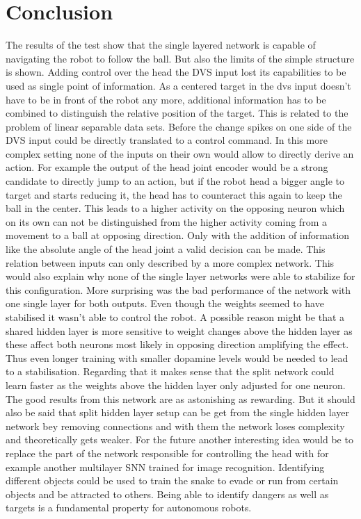\chapter{Conclusion}
The results of the test show that the single layered network is capable of navigating the robot to follow the ball. But also the limits of the simple structure is shown. Adding control over the head the DVS input lost its capabilities to be used as single point of information. As a centered target in the dvs input doesn't have to be in front of the robot any more, additional information has to be combined to distinguish the relative position of the target. This is related to the problem of linear separable data sets. Before the change spikes on one side of the DVS input could be directly translated to a control command. In this more complex setting none of the inputs on their own would allow to directly derive an action. For example the output of the head joint encoder would be a strong candidate to directly jump to an action, but if the robot head a bigger angle to target and starts reducing it, the head has to counteract this again to keep the ball in the center. This leads to a higher activity on the opposing neuron which on its own can not be distinguished from the higher activity coming from a movement to a ball at opposing direction. Only with the addition of information like the absolute angle of the head joint a valid decision can be made. This relation between inputs can only described by a more complex network. This would also explain why none of the single layer networks were able to stabilize for this configuration. More surprising was the bad performance of the network with one single layer for both outputs. Even though the weights seemed to have stabilised it wasn't able to control the robot. A possible reason might be that a shared hidden layer is more sensitive to weight changes above the hidden layer as these affect both neurons most likely in opposing direction amplifying the effect. Thus even longer training with smaller dopamine levels would be needed to lead to a stabilisation.
Regarding that it makes sense that the split network could learn faster as the weights above the hidden layer only adjusted for one neuron. The good results from this network are as astonishing as rewarding. But it should also be said that split hidden layer setup can be get from the single hidden layer network bey removing connections and with them the network loses complexity and theoretically gets weaker.
For the future another interesting idea would be to replace the part of the network responsible for controlling the head with for example another multilayer SNN trained for image recognition. Identifying different objects could be used to train the snake to evade or run from certain objects and be attracted to others. Being able to identify dangers as well as targets is a fundamental property for autonomous robots. 



